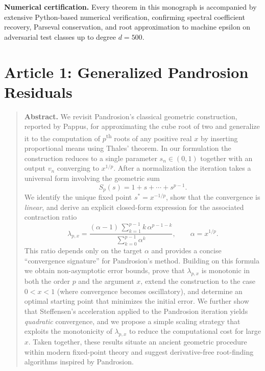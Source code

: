 \documentclass[10pt,a4paper,oneside]{book}
\theoremstyle{definition}
\theoremstyle{remark}
\newenvironment{abstract}{\begin{quote}\small\textbf{Abstract.}}{\end{quote}}
\begin{document}
\medskip

\textbf{Numerical certification.}\quad
Every theorem in this monograph is accompanied by extensive Python-based numerical verification, confirming spectral coefficient recovery, Parseval conservation, and root approximation to machine epsilon on adversarial test classes up to degree $d=500$.

\chapter{Article 1: Generalized Pandrosion Residuals}
\graphicspath{{../figures/}}


\begin{abstract}
We revisit Pandrosion's classical geometric construction, reported by Pappus, for approximating the cube root of two and generalize it to the computation of $p$\textsuperscript{th} roots of any positive real $x$ by inserting proportional means using Thales' theorem.  In our formulation the construction reduces to a single parameter $s_n \in(0,1)$ together with an output $v_n$ converging to $x^{1/p}$.  After a normalization the iteration takes a universal form involving the geometric sum
\[
  S_p(s)=1+s+\cdots+s^{p-1}.
\]
We identify the unique fixed point $s^* = x^{-1/p}$, show that the convergence is \emph{linear}, and derive an explicit closed-form expression for the associated contraction ratio
\[
  \lambda_{p,x} = \frac{(\alpha - 1)\,\sum_{k=1}^{p-1} k\,\alpha^{p-1-k}}{\sum_{k=0}^{p-1} \alpha^k},
  \qquad \alpha = x^{1/p}.
\]
This ratio depends only on the target $\alpha$ and provides a concise ``convergence signature'' for Pandrosion's method.  Building on this formula we obtain non-asymptotic error bounds, prove that $\lambda_{p,x}$ is monotonic in both the order $p$ and the argument $x$, extend the construction to the case $0<x<1$ (where convergence becomes oscillatory), and determine an optimal starting point that minimizes the initial error.  We further show that Steffensen's acceleration applied to the Pandrosion iteration yields \emph{quadratic} convergence, and we propose a simple scaling strategy that exploits the monotonicity of $\lambda_{p,x}$ to reduce the computational cost for large $x$.  Taken together, these results situate an ancient geometric procedure within modern fixed-point theory and suggest derivative-free root-finding algorithms inspired by Pandrosion.
\end{abstract}
\end{document}
